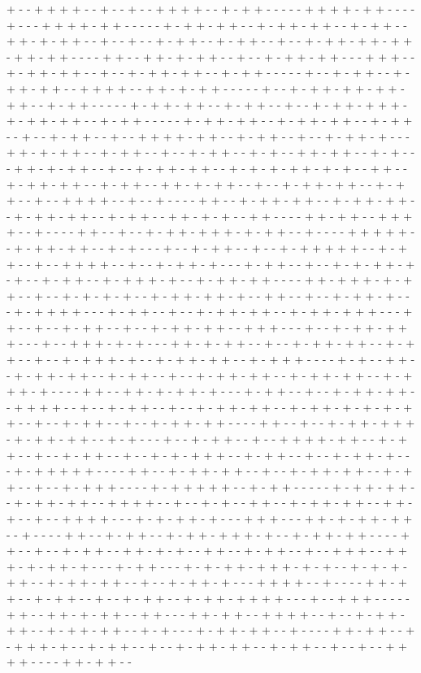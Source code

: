+ - - + + + + - - + - - + - - + + + + - - + - + + - - - - - + + + + - + + - - - - + - - - + + + + - + + - - - - - + - + + - + + - - + - + + - + + - - + - + + - - + + - + - + + - - + - - + - - + - + + - - + - + + - - + - - + - + + - + + - + + - + + - + + - - - - + + - - + + - + - + + - - + - - + - + + - + + - - - + + + - - + - + + - + + - - + - - + - + + - + + - - + - + + - - - - - + - - + - + + - - + - + + - + + - - + + + + - - + + - + - + + - - - - - + - - + - + + - + + - + + - + + - - + - + + - - - - - + - + + - + + - - + - + + - - + - - + - + + - + + + - + - + + - + + - - + - + + - - - - - + - + + - + + - - + - + + - + + - - + - + + - - + - - + - + + - - + - - + + + + - + + - - + - + + - - + - - + - + + - + - - - + + - + - + + - - + - + + - - + - - + - + + - - + - + - - + + - + + - - + - + - - - + + - + - + + - - + - - + - + + - + + - - + - + - + - + + - + - + - - + + - - + - + + - + + - - + - + + - - + + - + - + + - - + - - + - + + - + + - - + - + + - - + - - + + + + - - + - - + - - - - + + - - + - + + - + + - - + - + + - + + - - + - + + - + + - - + - + + - - + + - + - + - - + + - - - - + + - + + - - + + + + - - + - - - - + + - - + - - + - + + - + + + - + - + + - - + - - - - + + + + + - - + - + + - + + - - + - + - - - + - - + - + + - - + - - + - + + + + + - - + - + + - - + - - + + + + - - + - - + - + + - + - - - + - + + - - + - - + - + - + + - + - + - - + - + + - - + - + + + - + - - + - + + - + + - - - - + + - + + + - + - + + - - + - - + - + - + - + - - + - + + - + + - + - - + + - - + - - + - + + - + - - - + - + + + + - - - + - + + - - + - - + - + + - + + - - + - + + - + + + - - - + + - - + - - + - + + - - + - - + - + + - + + - - + + + - - - + - - + - + + - + + + - - - + - - + + + - + - + - - - + + - + - + + - - + - - + - + + - + + - - + - + + - - + - - + - + + + - + - - + - + + - + + - - + - + + + - - - - + - + - - + + - - + - + + - + + - - + - + + - - + - - + - + + - + + - - + - + + - + + - - + - + + + - + - - - - + + - - + + - + - + + - + - - - + - + + - - + - - + - + + - + + - - + + + + - - + - - + - + + - - + - - + - + + - + + - - + - + + - + - + - + - + + - - + - - + - + + - - + - - + - + + - + + - - - - + + - - + - - + - + + - + + + - + - + + - + + - - + - + - - - + - - + - + + - - + - - + + + + - + + - - + - + + - - + - - + - + + - - + - - + - + - + + + - - + - + + - - + - - + - + + - + - - - + - + + + + + - - - - + + - - + - + + - + + - - + - - + - + + - + + - - + - + + - - + - - + - + + + - - - - + - + + + + + - - + - + + - - - - - + - + + - + + - - + - + + - + + - - + + + + - - + - - + - + - - + + - - + - + + - + + - - + + - + - - + - - + + + + - - - + - + - + + - + - - - + + + - - - + + - + - + + - + + - - + - - - - + + - - + - + + - - + - + + - + + + - + - - + - + + - + + - - - - + + - - + - - + - + + - - + + - + - + - - + + - - + - + + - - + - - + + + - - + + + - + - + + - + - - - + - + + - - - + - + - + + - + + + - + - + - - + - + - + - + + - - + - + + - + + - - + - - + - + + - + - - - + + + + - - + - - - - + + - + + - - + - + + - - + - - + - + + - - + - + + - + + + + - - - + - - + + + - - - - - + + - - + + - + - + + - - + + - - - + + - + + - - + + + + - - + - - + - + + - + + - - + - + + - + + - - + - + - - - + - + + - + + - - + - - - - + + - + + - - + - + + + - + - - + - + + - - + - - + - + + - + + - - + - + + - - + - - + - - + + + + - - - - + + - + + - - 